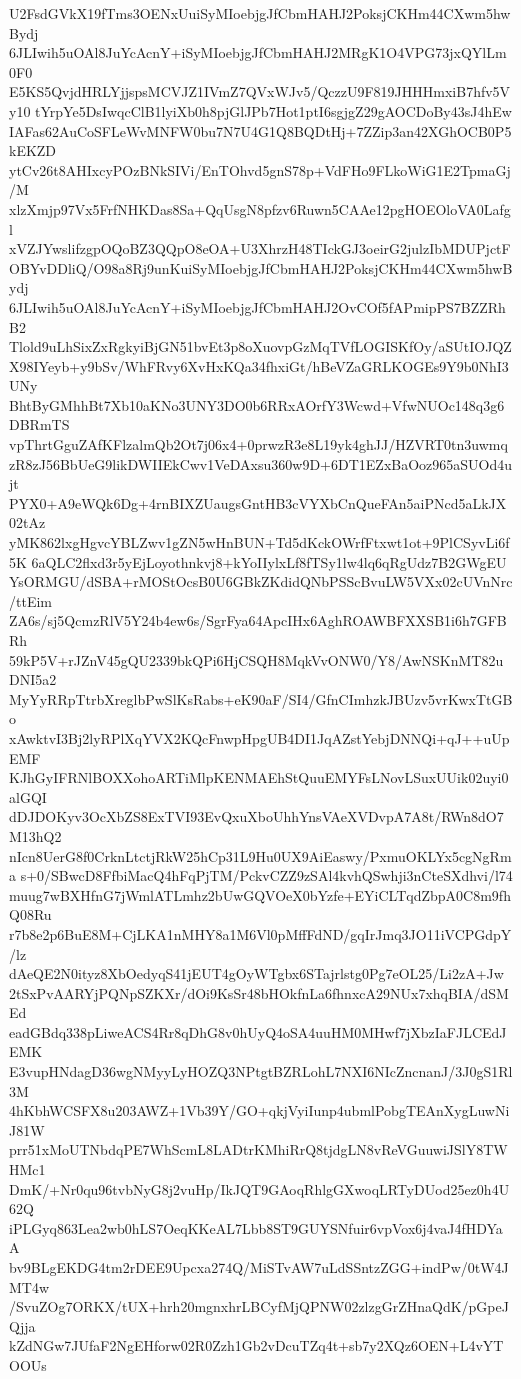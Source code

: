 U2FsdGVkX19fTms3OENxUuiSyMIoebjgJfCbmHAHJ2PoksjCKHm44CXwm5hwBydj
6JLIwih5uOAl8JuYcAcnY+iSyMIoebjgJfCbmHAHJ2MRgK1O4VPG73jxQYlLm0F0
E5KS5QvjdHRLYjjspsMCVJZ1IVmZ7QVxWJv5/QczzU9F819JHHHmxiB7hfv5Vy10
tYrpYe5DsIwqcClB1lyiXb0h8pjGlJPb7Hot1ptI6sgjgZ29gAOCDoBy43sJ4hEw
IAFas62AuCoSFLeWvMNFW0bu7N7U4G1Q8BQDtHj+7ZZip3an42XGhOCB0P5kEKZD
ytCv26t8AHIxcyPOzBNkSIVi/EnTOhvd5gnS78p+VdFHo9FLkoWiG1E2TpmaGj/M
xlzXmjp97Vx5FrfNHKDas8Sa+QqUsgN8pfzv6Ruwn5CAAe12pgHOEOloVA0Lafgl
xVZJYwslifzgpOQoBZ3QQpO8eOA+U3XhrzH48TIckGJ3oeirG2julzIbMDUPjctF
OBYvDDliQ/O98a8Rj9unKuiSyMIoebjgJfCbmHAHJ2PoksjCKHm44CXwm5hwBydj
6JLIwih5uOAl8JuYcAcnY+iSyMIoebjgJfCbmHAHJ2OvCOf5fAPmipPS7BZZRhB2
Tlold9uLhSixZxRgkyiBjGN51bvEt3p8oXuovpGzMqTVfLOGISKfOy/aSUtIOJQZ
X98IYeyb+y9bSv/WhFRvy6XvHxKQa34fhxiGt/hBeVZaGRLKOGEs9Y9b0NhI3UNy
BhtByGMhhBt7Xb10aKNo3UNY3DO0b6RRxAOrfY3Wcwd+VfwNUOc148q3g6DBRmTS
vpThrtGguZAfKFlzalmQb2Ot7j06x4+0prwzR3e8L19yk4ghJJ/HZVRT0tn3uwmq
zR8zJ56BbUeG9likDWIIEkCwv1VeDAxsu360w9D+6DT1EZxBaOoz965aSUOd4ujt
PYX0+A9eWQk6Dg+4rnBIXZUaugsGntHB3cVYXbCnQueFAn5aiPNcd5aLkJX02tAz
yMK862lxgHgvcYBLZwv1gZN5wHnBUN+Td5dKckOWrfFtxwt1ot+9PlCSyvLi6f5K
6aQLC2flxd3r5yEjLoyothnkvj8+kYoIIylxLf8fTSy1lw4lq6qRgUdz7B2GWgEU
YsORMGU/dSBA+rMOStOcsB0U6GBkZKdidQNbPSScBvuLW5VXx02cUVnNrc/ttEim
ZA6s/sj5QcmzRlV5Y24b4ew6s/SgrFya64ApcIHx6AghROAWBFXXSB1i6h7GFBRh
59kP5V+rJZnV45gQU2339bkQPi6HjCSQH8MqkVvONW0/Y8/AwNSKnMT82uDNI5a2
MyYyRRpTtrbXreglbPwSlKsRabs+eK90aF/SI4/GfnCImhzkJBUzv5vrKwxTtGBo
xAwktvI3Bj2lyRPlXqYVX2KQcFnwpHpgUB4DI1JqAZstYebjDNNQi+qJ++uUpEMF
KJhGyIFRNlBOXXohoARTiMlpKENMAEhStQuuEMYFsLNovLSuxUUik02uyi0alGQI
dDJDOKyv3OcXbZS8ExTVI93EvQxuXboUhhYnsVAeXVDvpA7A8t/RWn8dO7M13hQ2
nIcn8UerG8f0CrknLtctjRkW25hCp31L9Hu0UX9AiEaswy/PxmuOKLYx5cgNgRma
s+0/SBwcD8FfbiMacQ4hFqPjTM/PckvCZZ9zSAl4kvhQSwhji3nCteSXdhvi/l74
muug7wBXHfnG7jWmlATLmhz2bUwGQVOeX0bYzfe+EYiCLTqdZbpA0C8m9fhQ08Ru
r7b8e2p6BuE8M+CjLKA1nMHY8a1M6Vl0pMffFdND/gqIrJmq3JO11iVCPGdpY/lz
dAeQE2N0ityz8XbOedyqS41jEUT4gOyWTgbx6STajrlstg0Pg7eOL25/Li2zA+Jw
2tSxPvAARYjPQNpSZKXr/dOi9KsSr48bHOkfnLa6fhnxcA29NUx7xhqBIA/dSMEd
eadGBdq338pLiweACS4Rr8qDhG8v0hUyQ4oSA4uuHM0MHwf7jXbzIaFJLCEdJEMK
E3vupHNdagD36wgNMyyLyHOZQ3NPtgtBZRLohL7NXI6NIcZncnanJ/3J0gS1Rl3M
4hKbhWCSFX8u203AWZ+1Vb39Y/GO+qkjVyiIunp4ubmlPobgTEAnXygLuwNiJ81W
prr51xMoUTNbdqPE7WhScmL8LADtrKMhiRrQ8tjdgLN8vReVGuuwiJSlY8TWHMc1
DmK/+Nr0qu96tvbNyG8j2vuHp/IkJQT9GAoqRhlgGXwoqLRTyDUod25ez0h4U62Q
iPLGyq863Lea2wb0hLS7OeqKKeAL7Lbb8ST9GUYSNfuir6vpVox6j4vaJ4fHDYaA
bv9BLgEKDG4tm2rDEE9Upcxa274Q/MiSTvAW7uLdSSntzZGG+indPw/0tW4JMT4w
/SvuZOg7ORKX/tUX+hrh20mgnxhrLBCyfMjQPNW02zlzgGrZHnaQdK/pGpeJQjja
kZdNGw7JUfaF2NgEHforw02R0Zzh1Gb2vDcuTZq4t+sb7y2XQz6OEN+L4vYTOOUs
